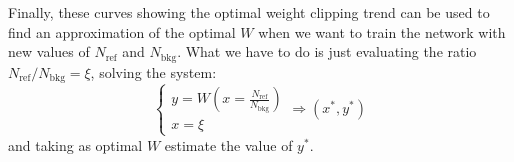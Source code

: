 Finally, these curves showing the optimal weight clipping trend can be used to find an approximation of the optimal $W$ when we want to train the network with new values of $N_\mathrm{ref}$ and $N_\mathrm{bkg}$. What we have to do is just evaluating the ratio $N_\mathrm{ref}/N_\mathrm{bkg} = \xi$, solving the system:
\begin{equation*}
	\begin{cases}
		y = W \left( x = \frac{N_\mathrm{ref}}{N_\mathrm{bkg}} \right)	\\
		x = \xi
	\end{cases}
	\Longrightarrow (x^*,y^*)
\end{equation*}
and taking as optimal $W$ estimate the value of $y^*$.